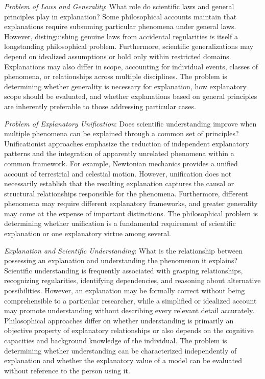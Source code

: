 \emph{Problem of Laws and Generality}: What role do scientific laws and general principles play in explanation? Some philosophical accounts maintain that explanations require subsuming particular phenomena under general laws. However, distinguishing genuine laws from accidental regularities is itself a longstanding philosophical problem. Furthermore, scientific generalizations may depend on idealized assumptions or hold only within restricted domains. Explanations may also differ in scope, accounting for individual events, classes of phenomena, or relationships across multiple disciplines. The problem is determining whether generality is necessary for explanation, how explanatory scope should be evaluated, and whether explanations based on general principles are inherently preferable to those addressing particular cases.

\emph{Problem of Explanatory Unification}: Does scientific understanding improve when multiple phenomena can be explained through a common set of principles? Unificationist approaches emphasize the reduction of independent explanatory patterns and the integration of apparently unrelated phenomena within a common framework. For example, Newtonian mechanics provides a unified account of terrestrial and celestial motion. However, unification does not necessarily establish that the resulting explanation captures the causal or structural relationships responsible for the phenomena. Furthermore, different phenomena may require different explanatory frameworks, and greater generality may come at the expense of important distinctions. The philosophical problem is determining whether unification is a fundamental requirement of scientific explanation or one explanatory virtue among several.

\emph{Explanation and Scientific Understanding}: What is the relationship between possessing an explanation and understanding the phenomenon it explains? Scientific understanding is frequently associated with grasping relationships, recognizing regularities, identifying dependencies, and reasoning about alternative possibilities. However, an explanation may be formally correct without being comprehensible to a particular researcher, while a simplified or idealized account may promote understanding without describing every relevant detail accurately. Philosophical approaches differ on whether understanding is primarily an objective property of explanatory relationships or also depends on the cognitive capacities and background knowledge of the individual. The problem is determining whether understanding can be characterized independently of explanation and whether the explanatory value of a model can be evaluated without reference to the person using it.

